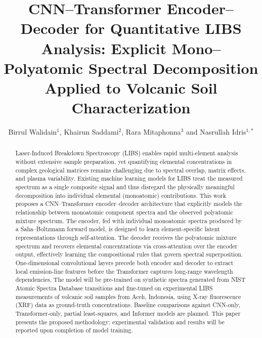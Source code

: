 \documentclass{iopjournal}
\begin{document}

\title{CNN--Transformer Encoder--Decoder for Quantitative LIBS Analysis: Explicit Mono--Polyatomic Spectral Decomposition Applied to Volcanic Soil Characterization}

\author{Birrul Walidain$^{1}$, Khairun Saddami$^2$, Rara Mitaphonna$^3$ and Nasrullah Idris$^{1,*}$}






\begin{abstract}
Laser-Induced Breakdown Spectroscopy (LIBS) enables rapid multi-element analysis without extensive sample preparation, yet quantifying elemental concentrations in complex geological matrices remains challenging due to spectral overlap, matrix effects, and plasma variability. Existing machine learning models for LIBS treat the measured spectrum as a single composite signal and thus disregard the physically meaningful decomposition into individual elemental (monoatomic) contributions. This work proposes a CNN--Transformer encoder--decoder architecture that explicitly models the relationship between monoatomic component spectra and the observed polyatomic mixture spectrum. The encoder, fed with individual monoatomic spectra produced by a Saha--Boltzmann forward model, is designed to learn element-specific latent representations through self-attention. The decoder receives the polyatomic mixture spectrum and recovers elemental concentrations via cross-attention over the encoder output, effectively learning the compositional rules that govern spectral superposition. One-dimensional convolutional layers precede both encoder and decoder to extract local emission-line features before the Transformer captures long-range wavelength dependencies. The model will be pre-trained on synthetic spectra generated from NIST Atomic Spectra Database transitions and fine-tuned on experimental LIBS measurements of volcanic soil samples from Aceh, Indonesia, using X-ray fluorescence (XRF) data as ground-truth concentrations. Baseline comparisons against CNN-only, Transformer-only, partial least-squares, and Informer models are planned. This paper presents the proposed methodology; experimental validation and results will be reported upon completion of model training.
\end{abstract}
\end{document}
